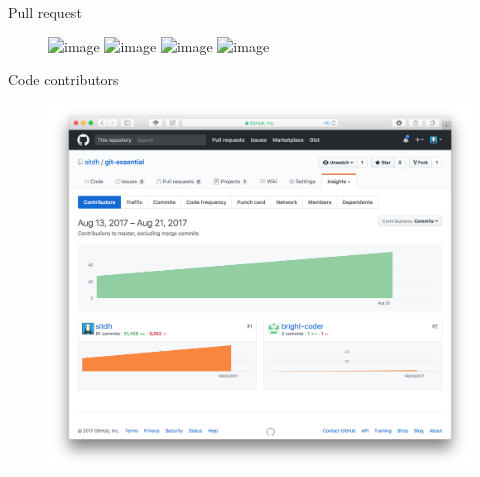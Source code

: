 \documentclass{beamer}
\begin{document}
\begin{frame}{Pull request}
    \begin{figure}
        \center
        \includegraphics<1>[width=.9\textwidth]{git-essential-5-pull-req-0}
        \includegraphics<2>[width=.9\textwidth]{git-essential-5-pull-req-1}
        \includegraphics<3>[width=.9\textwidth]{git-essential-5-pull-req-2}
        \includegraphics<4>[width=.9\textwidth]{git-essential-5-pull-req-4}
        \label{fig:git-essential-5-pull-req}
    \end{figure}
\end{frame}

\begin{frame}{Code contributors}
    \begin{figure}
        \center
        \includegraphics[width=.9\textwidth]{git-code-contributions}
        \label{fig:git-code-contributors}
    \end{figure}
\end{frame}
\end{document}
